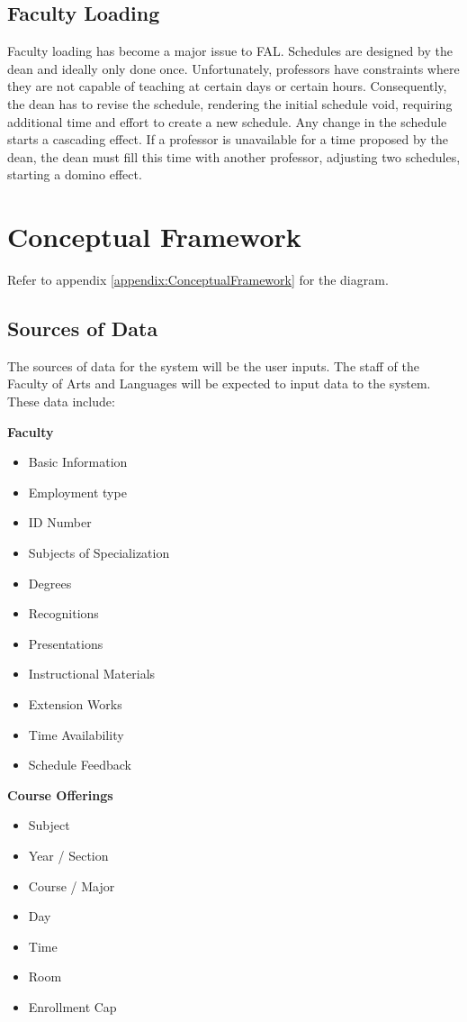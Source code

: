 \subsection{Faculty Loading}
Faculty loading has become a major issue to FAL. Schedules are designed by the dean and ideally only done once. Unfortunately, professors have constraints where they are not capable of teaching at certain days or certain hours. Consequently, the dean has to revise the schedule, rendering the initial schedule void, requiring additional time and effort to create a new schedule. Any change in the schedule starts a cascading effect. If a professor is unavailable for a time proposed by the dean, the dean must fill this time with another professor, adjusting two schedules, starting a domino effect.

\section{Conceptual Framework}
Refer to appendix \ref{appendix:ConceptualFramework} for the diagram.

\subsection{Sources of Data}
The sources of data for the system will be the user inputs. The staff of the Faculty of Arts and Languages will be expected to input data to the system. These data include: 

\textbf{Faculty}
\begin{itemize}
\item Basic Information
\item Employment type
\item ID Number
\item Subjects of Specialization
\item Degrees
\item Recognitions
\item Presentations
\item Instructional Materials
\item Extension Works
\item Time Availability
\item Schedule Feedback
\end{itemize}

\textbf{Course Offerings}
\begin{itemize}
\item Subject
\item Year / Section
\item Course / Major
\item Day
\item Time
\item Room
\item Enrollment Cap
\end{itemize}

